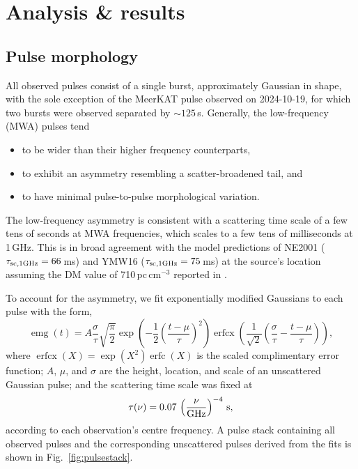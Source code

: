\documentclass[fleqn,usenatbib]{mnras}
\DeclareMathOperator{\erfcx}{erfcx}
\DeclareMathOperator{\erfc}{erfc}
\DeclareMathOperator{\emg}{emg}
\newcommand{\Fig}{Fig.}
\begin{document}
\section{Analysis \& results} \label{sec:analysis}

\subsection{Pulse morphology}

All observed pulses consist of a single burst, approximately Gaussian in shape, with the sole exception of the MeerKAT pulse observed on 2024-10-19, for which two bursts were observed separated by ${\sim}125\,$s.
Generally, the low-frequency (MWA) pulses tend
\begin{itemize}
    \item to be wider than their higher frequency counterparts,
    \item to exhibit an asymmetry resembling a scatter-broadened tail, and
    \item to have minimal pulse-to-pulse morphological variation.
\end{itemize}

The low-frequency asymmetry is consistent with a scattering time scale of a few tens of seconds at MWA frequencies, which scales to a few tens of milliseconds at 1\,GHz.
This is in broad agreement with the model predictions of NE2001 ($\tau_{\rm sc,1GHz} = 66\,$ms) and YMW16 ($\tau_{\rm sc,1 GHz} = 75\,$ms) at the source's location assuming the DM value of 710\,pc\,cm$^{-3}$ reported in .

To account for the asymmetry, we fit exponentially modified Gaussians to each pulse with the form,
\begin{equation}
  \emg(t) = A \frac{\sigma}{\tau}\sqrt{\frac{\pi}{2}}
    \exp\left(-\frac12 \left( \frac{t - \mu}{\tau} \right)^2 \right)  \erfcx \left(\frac{1}{\sqrt{2}} \left(\frac{\sigma}{\tau} - \frac{t - \mu}{\tau} \right) \right),
  \label{eqn:emg}
\end{equation}
where $\erfcx(X) = \exp(X^2) \erfc(X)$ is the scaled complimentary error function; $A$, $\mu$, and $\sigma$ are the height, location, and scale of an unscattered Gaussian pulse; and the scattering time scale was fixed at
\begin{equation}
      \tau(\nu) = 0.07\, \left(\frac{\nu}{\rm GHz}\right)^{-4} \, {\rm s},
\end{equation}
according to each observation's centre frequency.
A pulse stack containing all observed pulses and the corresponding unscattered pulses derived from the fits is shown in \Fig~\ref{fig:pulsestack}.
\end{document}
